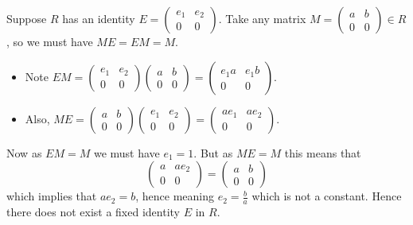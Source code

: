 \begin{questions}
    \item \begin{partquestions}{\roman*}
        \item Suppose $R$ has an identity $E = \begin{pmatrix}e_1&e_2\\0&0\end{pmatrix}$. Take any matrix $M = \begin{pmatrix}a&b\\0&0\end{pmatrix} \in R$, so we must have $ME = EM = M$.
        \begin{itemize}
            \item Note $EM = \begin{pmatrix}e_1&e_2\\0&0\end{pmatrix}\begin{pmatrix}a&b\\0&0\end{pmatrix} = \begin{pmatrix}e_1a&e_1b\\0&0\end{pmatrix}$.
            \item Also, $ME = \begin{pmatrix}a&b\\0&0\end{pmatrix}\begin{pmatrix}e_1&e_2\\0&0\end{pmatrix} = \begin{pmatrix}ae_1&ae_2\\0&0\end{pmatrix}$.
        \end{itemize}
        Now as $EM = M$ we must have $e_1 = 1$. But as $ME = M$ this means that
        \[
            \begin{pmatrix}a&ae_2\\0&0\end{pmatrix} = \begin{pmatrix}a&b\\0&0\end{pmatrix}
        \]
        which implies that $ae_2 = b$, hence meaning $e_2 = \frac{b}{a}$ which is not a constant. Hence there does not exist a fixed identity $E$ in $R$.


\end{partquestions}
\end{questions}
